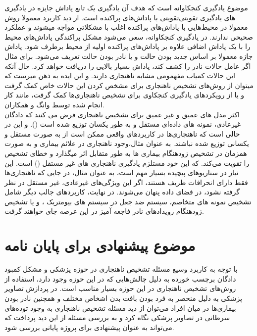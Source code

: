 \documentclass[12pt,a4paper]{report}
\begin{document}
موضوع یادگیری کنجکاوانه است\cite{https://doi.org/10.48550/arxiv.1810.12894, https://doi.org/10.48550/arxiv.1808.04355, https://doi.org/10.48550/arxiv.1705.05363} که هدف آن یادگیری یک تابع پاداش جایزه در یادگیری تقویتی با پاداش‌های پراکنده است. از دید کاربرد معمولا روش‌‎های یادگیری تقویتی معمولا در محیط‌هایی با پاداش‌های پراکنده اغلب با مشکلاتی مواجه میشوند و عملکرد صحیحی ندارند. در یادگیری کنجکاوانه، سعی می‌شود مشکل پراکندگی پاداش‌های محیط را با یک پاداش اضافی علاوه بر پاداش‌های پراکنده اولیه از محیط برطرف شود. پاداش جازه معمولا بر اساس جدید بودن حالت و یا نادر بودن حالت تعریف می‌شود. برای مثال اگر عامل حالات نادر را کشف کند، پاداش بسیار بالایی را دریافت خواهد کرد. حال آنکه این حالات کمیاب مفهمومی مشابه ناهنجاری دارند. و این ایده به ذهن میرست که میتوان از روش‌های تشخیص ناهنجاری برای مشخص کردن این حالات خاص کمک گرفت و یا از رویکرد‌های یادگیری کنجکاوی برای تشخیص ناهنجاری‌ها کمک گرفت، مانند کار انجام شده توسط وانگ و همکاران\cite{ijcai2020p408}.\\

اکثر مدل های عمیق و غیر عمیق برای تشخیص ناهنجاری فرض می کنند که دادگان غیرعادی، نمونه های داده‌ای مستقل و به طور یکسان توزیع شده است (). و این در حالی است که ناهنجاری‌ها در کاربرد‌های واقعی ممکن است از به صورت مستقل و یکسانی توزیع شده نباشند. به عنوان مثال،وجود ناهنجاری در علائم بیماری و به صورت همزمان در تشخیص زودهنگام بیماری ها به طور متقابل اثر میگذارد و خطای تشخیص را تقویت می‌کند. که این خود مستلزم یادگیری ناهنجاری های غیر مستقل () است\cite{Pang2019NonIIDOD}. این نیاز در سناریوهای پیچیده بسیار مهم است، به عنوان مثال، در جایی که ناهنجاری‌ها فقط دارای انحرافات ظریف هستند،‌ اگر این ویژگی‌های غیرعادی، غیر مستقل در نظر گرفته نشود، در فضای داده پنهان می‌شوند. در نهایت، کاربردهای جالب دیگر شامل تشخیص نمونه های متخاصم\cite{https://doi.org/10.48550/arxiv.1702.06280, https://doi.org/10.48550/arxiv.1802.03041}، سیستم ضد جعل در سیستم های بیومتریک \cite{KittlerJosef2020ASEf, PrezCabo2019DeepAD}، و یا تشخیص زودهنگام رویدادهای نادر فاجعه آمیز در این عرصه جای خواهند گرفت.
	\section{موضوع پیشنهادی برای پایان نامه}
با توجه به کاربرد وسیع مسئله تشخیص ناهنجاری در حوزه پزشکی و مشکل کمبود دادگان برچسب خورده به دلیل چالش‌هایی که در این حوزه وجود دارد، استفاده از روش‌های تشخیص ناهنجاری در این حوزه بسیار مناسب است. در پردازش تصاویر پزشکی به دلیل منحصر به فرد بودن بافت بدن اشخاص مختلف و همچنین نادر بودن بیماری‌ها در میان افراد می‌توان از دید مسئله تشخیص ناهنجاری به وجود توده‌های سرطانی در تصاویر پزشکی نگاه کرد و به بررسی مسئله از این دید پرداخت که می‌تواند به عنوان پیشنهادی برای پروژه پایانی بررسی شود.
	
\end{document}
